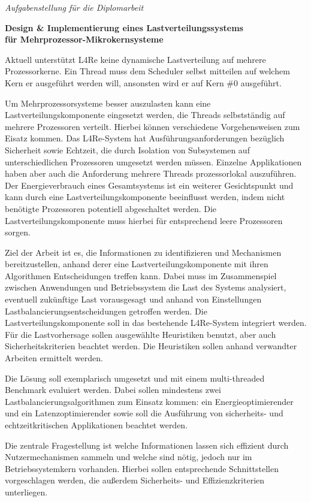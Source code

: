 \begin{centering}
\large
\textit{Aufgabenstellung für die Diplomarbeit}
\\
\end{centering}

\vspace{1cm}

\begin{flushright}
\normalsize\noindent
\textbf{Design \& Implementierung eines Lastverteilungssystems\\ für
Mehrprozessor-Mikrokernsysteme}\\
\end{flushright}
\vspace{3mm}

Aktuell unterstützt L4Re keine dynamische Lastverteilung auf mehrere
Prozessorkerne. Ein Thread muss dem Scheduler selbst mitteilen auf welchem Kern
er ausgeführt werden will, ansonsten wird er auf Kern \#0 ausgeführt.

Um Mehrprozessorsysteme besser auszulasten kann eine Lastverteilungskomponente
eingesetzt werden, die Threads selbstständig auf mehrere Prozessoren verteilt.
Hierbei können verschiedene Vorgehensweisen zum Eisatz kommen.
Das L4Re-System hat Ausführungsanforderungen bezüglich Sicherheit sowie
Echtzeit, die durch Isolation von Subsystemen auf unterschiedlichen Prozessoren
umgesetzt werden müssen. Einzelne Applikationen haben aber auch die Anforderung
mehrere Threads prozessorlokal auszuführen.
Der Energieverbrauch eines Gesamtsystems ist ein weiterer Gesichtspunkt und
kann durch eine Lastverteilungskomponente beeinflusst werden, indem nicht
benötigte Prozessoren potentiell abgeschaltet werden. Die
Lastverteilungskomponente muss hierbei für entsprechend leere Prozessoren
sorgen.

Ziel der Arbeit ist es, die Informationen zu identifizieren und Mechanismen
bereitzustellen, anhand derer eine Lastverteilungskomponente mit  ihren
Algorithmen Entscheidungen treffen kann. Dabei muss im Zusammenspiel zwischen
Anwendungen und Betriebssystem die Last des Systems analysiert, eventuell
zukünftige Last vorausgesagt und anhand von Einstellungen
Lastbalancierungsentscheidungen getroffen werden.
Die Lastverteilungskomponente soll in das bestehende L4Re-System integriert
werden.
Für die Lastvorhersage sollen ausgewählte Heuristiken benutzt, aber auch
Sicherheitskriterien beachtet werden.
Die Heuristiken sollen anhand verwandter Arbeiten ermittelt werden.

Die Lösung soll exemplarisch umgesetzt und mit einem multi-threaded Benchmark
evaluiert werden.
Dabei sollen mindestens zwei Lastbalancierungsalgorithmen zum Einsatz kommen: ein
Energieoptimierender und ein Latenzoptimierender sowie soll die Ausführung von
sicherheits- und echtzeitkritischen Applikationen beachtet werden.

Die zentrale Fragestellung ist welche Informationen lassen sich effizient durch
Nutzermechanismen sammeln und welche sind nötig, jedoch nur im
Betriebssystemkern vorhanden. Hierbei sollen entsprechende Schnittstellen
vorgeschlagen werden, die außerdem Sicherheits- und Effizienzkriterien
unterliegen.
